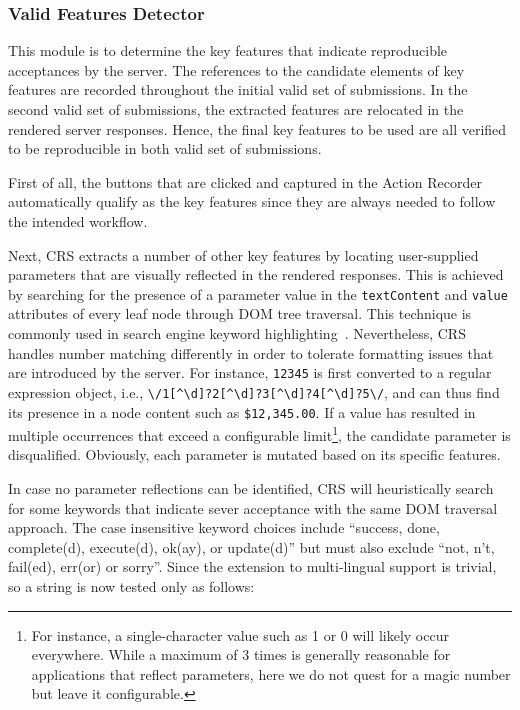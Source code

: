 \documentclass[letter]{sig-alternate-2013}
\begin{document}
\subsubsection{Valid Features Detector}
\label{sec:crs_valid_features}
This module is to determine the key features that indicate reproducible acceptances by the server. The references to the candidate elements of key features are recorded throughout the initial valid set of submissions. In the second valid set of submissions, the extracted features are relocated in the rendered server responses. Hence, the final key features to be used are all verified to be reproducible in both valid set of submissions. 

First of all, the buttons that are clicked and captured in the Action Recorder automatically qualify as the key features since they are always needed to follow the intended workflow. 

Next, CRS extracts a number of other key features by locating user-supplied parameters that are visually reflected in the rendered responses. This is achieved by searching for the presence of a parameter value in the \verb"textContent" and \verb"value" attributes of every leaf node through DOM tree traversal. This technique is commonly used in search engine keyword highlighting~\cite{keyword-highlight}. Nevertheless, CRS handles number matching differently in order to tolerate formatting issues that are introduced by the server. For instance, \verb"12345" is first converted to a regular expression object, i.e., \verb"\/1[^\d]?2[^\d]?3[^\d]?4[^\d]?5\/", and can thus find its presence in a node content such as \verb"$12,345.00". If a value has resulted in multiple occurrences that exceed a configurable limit\footnote{For instance, a single-character value such as 1 or 0 will likely occur everywhere. While a maximum of 3 times is generally reasonable for applications that reflect parameters, here we do not quest for a magic number but leave it configurable.}, the candidate parameter is disqualified. Obviously, each parameter is mutated based on its specific features.

In case no parameter reflections can be identified, CRS will heuristically search for some keywords that indicate sever acceptance with the same DOM traversal approach. The case insensitive keyword choices include ``success, done, complete(d), execute(d), ok(ay), or update(d)'' but must also exclude ``not, n't, fail(ed), err(or) or sorry''. Since the extension to multi-lingual support is trivial, so a string is now tested only as follows:
\end{document}
